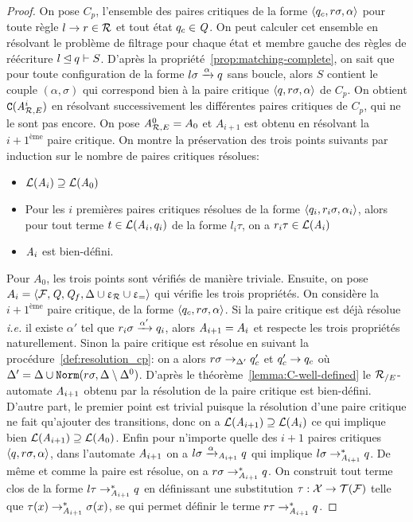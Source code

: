 \begin{proof}
  On pose $C_p$, l'ensemble des paires critiques de la forme $\langle q_c, r\sigma, \alpha\rangle$ pour toute règle $l\rightarrow r \in \mathcal R$ et tout état $q_c \in \mathit Q$.
  On peut calculer cet ensemble en résolvant le problème de filtrage pour chaque état et membre gauche des règles de réécriture $l \unlhd q \vdash S$.
  D'après la propriété~\ref{prop:matching-complete}, on sait que pour toute configuration de la forme $l\sigma \xrightarrow{\alpha} q$ sans boucle,
  alors $S$ contient le couple $(\alpha,\sigma)$ qui correspond bien à la paire critique $\langle q, r\sigma, \alpha \rangle$ de $C_p$.
  On obtient $\mathtt{C}({\mathit A}_{\mathcal R,E}^i)$ en résolvant successivement les différentes paires critiques de $C_p$, qui ne le sont pas encore.
  On pose ${\mathit A}_{\mathcal R,E}^0 = A_0$ et $A_{i+1}$ est obtenu en résolvant la $i+1^\text{ème}$ paire critique.
  On montre la préservation des trois points suivants par induction sur le nombre de paires critiques résolues:
  \begin{itemize}
  \item $\mathcal{L}(\mathit A_i) \supseteq \mathcal{L}(\mathit A_0)$
  \item Pour les $i$ premières paires critiques résolues de la forme $\langle q_i, r_i\sigma, \alpha_i\rangle$, alors
    pour tout terme $t \in \mathcal{L}(\mathit A_i, q_i)$ de la forme $l_i\tau$, on a $r_i\tau \in \mathcal{L}(\mathit A_i)$
  \item $\mathit A_i$ est bien-défini.
  \end{itemize}
  \medskip
  \noindent
  Pour $A_0$, les trois points sont vérifiés de manière triviale. Ensuite, on pose
  $A_i = \langle \mathcal{F}, \mathit Q, \mathit Q_f, \Delta\cup\upvarepsilon_{\mathcal R}\cup\upvarepsilon_{=}\rangle$ qui vérifie les trois propriétés.
  On considère la $i+1^\text{ème}$ paire critique, de la forme $\langle q_c, r\sigma, \alpha\rangle$.
  Si la paire critique est déjà résolue \textit{i.e.} il existe $\alpha'$ tel que
  $r_i\sigma \xrightarrow{\alpha'} q_i$, alors $\mathit A_{i+1} = A_i$ et respecte les trois propriétés naturellement.
  Sinon la paire critique est résolue en suivant la procédure~\ref{def:resolution_cp}: on a alors
  $r\sigma \rightarrow_{\Delta'} q_c'$ et $q_c'\rightarrow q_c$ où $\Delta' = \Delta \cup \mathtt{Norm}(r\sigma,\Delta \setminus\Delta^0)$.
  D'après le théorème~\ref{lemma:C-well-defined} le ${\mathcal R_{/E}}$-automate $\mathit A_{i+1}$ obtenu par la résolution de la paire critique
  est bien-défini. D'autre part, le premier point est trivial puisque la résolution d'une paire critique ne fait qu'ajouter
  des transitions, donc on a $\mathcal{L}(\mathit A_{i+1}) \supseteq \mathcal{L}(\mathit A_i)$ ce qui implique bien $\mathcal{L}(\mathit A_{i+1}) \supseteq \mathcal{L}(\mathit A_0)$.
  Enfin pour n'importe quelle des ${i+1}$ paires critiques $\langle q, r\sigma, \alpha\rangle$, dans l'automate $\mathit A_{i+1}$ on a
  $l\sigma \xrightarrow{\alpha}_{\mathit A_{i+1}} q$ qui implique $l\sigma \rightarrow_{\mathit A_{i+1}}^* q$. De même et comme la paire est résolue,
  on a $r\sigma \rightarrow_{\mathit A_{i+1}}^* q$. On construit tout terme clos de la forme $l\tau \rightarrow_{\mathit A_{i+1}}^* q$
  en définissant une substitution $\tau : \mathcal X \rightarrow \mathcal{T(F)}$ telle que $\tau(x) \rightarrow_{\mathit A_{i+1}}^* \sigma(x)$, se qui permet 
  définir le terme $r\tau \rightarrow^*_{\mathit A_{i+1}} q$.


\end{proof}
